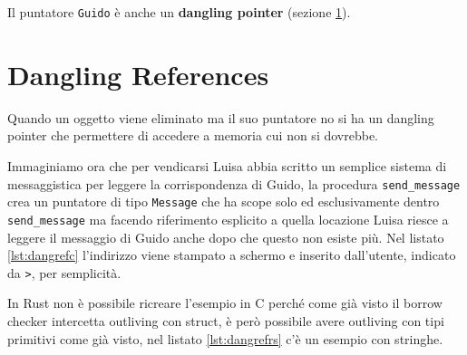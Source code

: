 \documentclass[Lau,binding=0.6cm]{sapthesis}
\newcommand{\textcode}[1]{\colorbox{backcolour}{\texttt{#1}}}
\begin{document}



Il puntatore \textcode{Guido} è anche un \textbf{dangling pointer} (sezione \ref{sec:dangling_reference}).

\section{Dangling References} \label{sec:dangling_reference}
Quando un oggetto viene eliminato ma il suo puntatore no si ha un dangling pointer che permettere di accedere a memoria cui non si dovrebbe.

Immaginiamo ora che per vendicarsi Luisa abbia scritto un semplice sistema di messaggistica per leggere la corrispondenza di Guido, la procedura \textcode{send\_message} crea un puntatore di tipo \textcode{Message} che ha scope solo ed esclusivamente dentro \textcode{send\_message} ma facendo riferimento esplicito a quella locazione Luisa riesce a leggere il messaggio di Guido anche dopo che questo non esiste più.
Nel listato \ref{lst:dangrefc} l'indirizzo viene stampato a schermo e inserito dall'utente, indicato da \textcode{>}, per semplicità.




In Rust non è possibile ricreare l'esempio in C perché come già visto il borrow checker intercetta outliving con struct, è però possibile avere outliving con tipi primitivi come già visto, nel listato \ref{lst:dangrefrs} c'è un esempio con stringhe.


\end{document}
